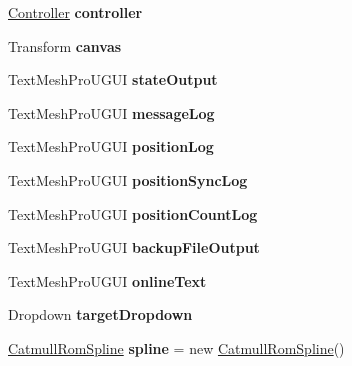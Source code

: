 \begin{DoxyCompactItemize}
\mbox{\hyperlink{class_controller}{Controller}} {\bfseries controller}
\item 
\mbox{\label{class_game_controller_a4849adfdbcb876592dd2ca2c8d3d6dd3}} 
Transform {\bfseries canvas}
\item 
\mbox{\label{class_game_controller_a49eb3e3e0f37bf17509d245d70d53c92}} 
Text\+Mesh\+Pro\+U\+G\+UI {\bfseries state\+Output}
\item 
\mbox{\label{class_game_controller_adf378f165de99cae2e7d1aefda44c9b3}} 
Text\+Mesh\+Pro\+U\+G\+UI {\bfseries message\+Log}
\item 
\mbox{\label{class_game_controller_afa5ed37ed93bb0d81b0672d89003cbd3}} 
Text\+Mesh\+Pro\+U\+G\+UI {\bfseries position\+Log}
\item 
\mbox{\label{class_game_controller_a194cfa82ca88646a0acc5a100a48a537}} 
Text\+Mesh\+Pro\+U\+G\+UI {\bfseries position\+Sync\+Log}
\item 
\mbox{\label{class_game_controller_ad6cb11ae2cdfe0570e0cbb5d6d167d76}} 
Text\+Mesh\+Pro\+U\+G\+UI {\bfseries position\+Count\+Log}
\item 
\mbox{\label{class_game_controller_a895c755f922fd5c6ae054e19ac2ec8d6}} 
Text\+Mesh\+Pro\+U\+G\+UI {\bfseries backup\+File\+Output}
\item 
\mbox{\label{class_game_controller_a6d6429aa7d893d6545ea3b30cf6e0ff1}} 
Text\+Mesh\+Pro\+U\+G\+UI {\bfseries online\+Text}
\item 
\mbox{\label{class_game_controller_aa7b734d3297bbe4c77049973d4dceff2}} 
Dropdown {\bfseries target\+Dropdown}
\item 
\mbox{\label{class_game_controller_a7818b7fb2d36055b1224484016cacf43}} 
\mbox{\hyperlink{class_catmull_rom_spline}{Catmull\+Rom\+Spline}} {\bfseries spline} = new \mbox{\hyperlink{class_catmull_rom_spline}{Catmull\+Rom\+Spline}}()
\item 

\end{DoxyCompactItemize}
